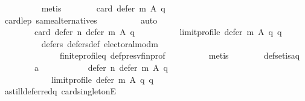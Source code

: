 \begin{isabellebody}
\ \ \ \ \ \ \ \ \isamarkupfalse%
\ metis\isanewline
\ \ \ \ \ \ \isamarkupfalse%
\ {\isachardoublequoteopen}card\ {\isacharparenleft}{\kern0pt}defer\ m\ A\ q{\isacharparenright}{\kern0pt}\ {\isasymge}\ {}{\isachardoublequoteclose}\isanewline
\ \ \ \ \ \ \ \ \isamarkupfalse%
\ card{\isacharunderscore}{\kern0pt}le{\isacharunderscore}{\kern0pt}{}{\isacharunderscore}{\kern0pt}p\ same{\isacharunderscore}{\kern0pt}alternatives\isanewline
\ \ \ \ \ \ \ \ \isamarkupfalse%
\ auto\isanewline
\ \ \ \ \ \ \isamarkupfalse%
\isanewline
\ \ \ \ \ \ \ \ {\isachardoublequoteopen}card\ {\isacharparenleft}{\kern0pt}defer\ n\ {\isacharparenleft}{\kern0pt}defer\ m\ A\ q{\isacharparenright}{\kern0pt}\isanewline
\ \ \ \ \ \ \ \ \ \ {\isacharparenleft}{\kern0pt}limit{\isacharunderscore}{\kern0pt}profile\ {\isacharparenleft}{\kern0pt}defer\ m\ A\ q{\isacharparenright}{\kern0pt}\ q{\isacharparenright}{\kern0pt}{\isacharparenright}{\kern0pt}\ {\isacharequal}{\kern0pt}\ {}{\isachardoublequoteclose}\isanewline
\ \ \ \ \ \ \ \ \isamarkupfalse%
\ defers{\isacharunderscore}{\kern0pt}{}\ defers{\isacharunderscore}{\kern0pt}def\ electoral{\isacharunderscore}{\kern0pt}mod{\isacharunderscore}{\kern0pt}m\isanewline
\ \ \ \ \ \ \ \ \ \ \ \ \ \ finite{\isacharunderscore}{\kern0pt}profile{\isacharunderscore}{\kern0pt}q\ def{\isacharunderscore}{\kern0pt}presv{\isacharunderscore}{\kern0pt}fin{\isacharunderscore}{\kern0pt}prof\isanewline
\ \ \ \ \ \ \ \ \isamarkupfalse%
\ metis\isanewline
\ \ \ \ \ \ \isamarkupfalse%
\ def{\isacharunderscore}{\kern0pt}set{\isacharunderscore}{\kern0pt}is{\isacharunderscore}{\kern0pt}a{\isacharunderscore}{\kern0pt}q{\isacharcolon}{\kern0pt}\isanewline
\ \ \ \ \ \ \ \ {\isachardoublequoteopen}{\isacharbraceleft}{\kern0pt}a{\isacharbraceright}{\kern0pt}\ {\isacharequal}{\kern0pt}\isanewline
\ \ \ \ \ \ \ \ \ \ defer\ n\ {\isacharparenleft}{\kern0pt}defer\ m\ A\ q{\isacharparenright}{\kern0pt}\isanewline
\ \ \ \ \ \ \ \ \ \ \ \ {\isacharparenleft}{\kern0pt}limit{\isacharunderscore}{\kern0pt}profile\ {\isacharparenleft}{\kern0pt}defer\ m\ A\ q{\isacharparenright}{\kern0pt}\ q{\isacharparenright}{\kern0pt}{\isachardoublequoteclose}\isanewline
\ \ \ \ \ \ \ \ \isamarkupfalse%
\ a{\isacharunderscore}{\kern0pt}still{\isacharunderscore}{\kern0pt}deferred{\isacharunderscore}{\kern0pt}q\ card{\isacharunderscore}{\kern0pt}{}{\isacharunderscore}{\kern0pt}singletonE\isanewline

\end{isabellebody}

